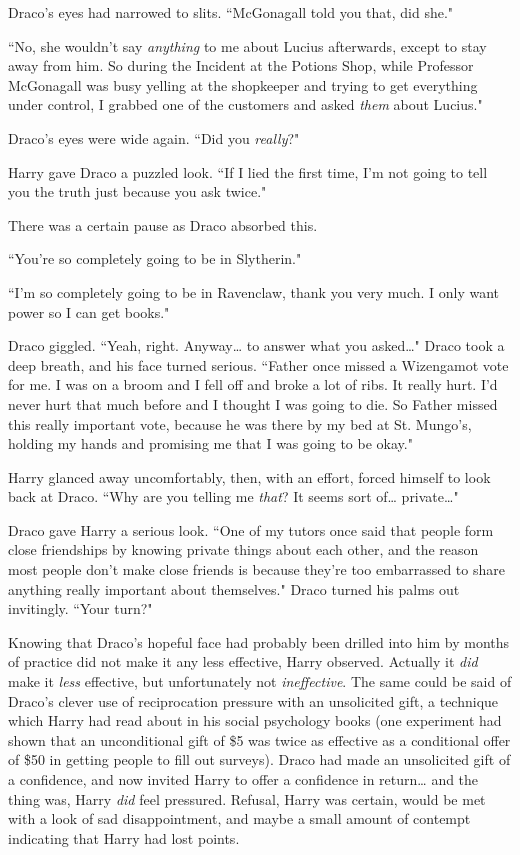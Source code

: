 Draco's eyes had narrowed to slits. ``McGonagall told you that, did she."

``No, she wouldn't say \emph{anything} to me about Lucius afterwards, except to stay away from him. So during the Incident at the Potions Shop, while Professor McGonagall was busy yelling at the shopkeeper and trying to get everything under control, I grabbed one of the customers and asked \emph{them} about Lucius."

Draco's eyes were wide again. ``Did you \emph{really}?"

Harry gave Draco a puzzled look. ``If I lied the first time, I'm not going to tell you the truth just because you ask twice."

There was a certain pause as Draco absorbed this.

``You're so completely going to be in Slytherin."

``I'm so completely going to be in Ravenclaw, thank you very much. I only want power so I can get books."

Draco giggled. ``Yeah, right. Anyway{\ldots} to answer what you asked{\ldots}" Draco took a deep breath, and his face turned serious. ``Father once missed a Wizengamot vote for me. I was on a broom and I fell off and broke a lot of ribs. It really hurt. I'd never hurt that much before and I thought I was going to die. So Father missed this really important vote, because he was there by my bed at St. Mungo's, holding my hands and promising me that I was going to be okay."

Harry glanced away uncomfortably, then, with an effort, forced himself to look back at Draco. ``Why are you telling me \emph{that}? It seems sort of{\ldots} private{\ldots}"

Draco gave Harry a serious look. ``One of my tutors once said that people form close friendships by knowing private things about each other, and the reason most people don't make close friends is because they're too embarrassed to share anything really important about themselves." Draco turned his palms out invitingly. ``Your turn?"

Knowing that Draco's hopeful face had probably been drilled into him by months of practice did not make it any less effective, Harry observed. Actually it \emph{did} make it \emph{less} effective, but unfortunately not \emph{ineffective}. The same could be said of Draco's clever use of reciprocation pressure with an unsolicited gift, a technique which Harry had read about in his social psychology books (one experiment had shown that an unconditional gift of \$5 was twice as effective as a conditional offer of \$50 in getting people to fill out surveys). Draco had made an unsolicited gift of a confidence, and now invited Harry to offer a confidence in return{\ldots} and the thing was, Harry \emph{did} feel pressured. Refusal, Harry was certain, would be met with a look of sad disappointment, and maybe a small amount of contempt indicating that Harry had lost points.

